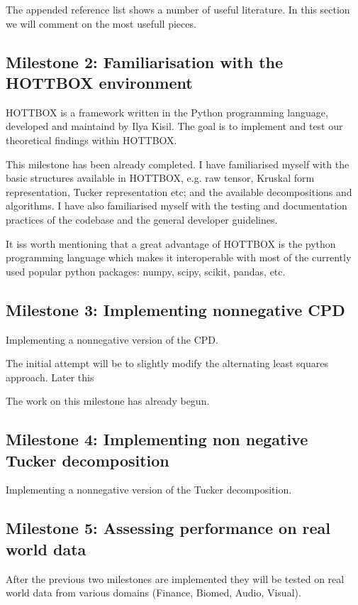 \documentclass{article}
\begin{document}
The appended reference list shows a number of useful literature. In this section we will comment on the most usefull pieces.

\subsection{Milestone 2: Familiarisation with the HOTTBOX environment}

HOTTBOX is a framework written in the Python programming language, developed and maintaind by Ilya Kisil. The goal is to implement and test our theoretical findings within HOTTBOX.

This milestone has been already completed. I have familiarised myself with the basic structures available in HOTTBOX, e.g. raw tensor, Kruskal form representation, Tucker representation etc; and the available decompositions and algorithms. I have also familiarised myself with the testing and documentation practices of the codebase and the general developer guidelines.

It iss worth mentioning that a great advantage of HOTTBOX is the python programming language which makes it interoperable with most of the currently used popular python packages: numpy, scipy, scikit, pandas, etc.


\subsection{Milestone 3: Implementing nonnegative CPD}
Implementing a nonnegative version of the CPD. 

The initial attempt will be to slightly modify the alternating least squares approach. Later this

The work on this milestone has already begun.

\subsection{Milestone 4: Implementing non negative Tucker decomposition}

Implementing a nonnegative version of the Tucker decomposition. 

\subsection{Milestone 5: Assessing performance on real world data}

After the previous two milestones are implemented they will be tested on real world data from various domains (Finance, Biomed, Audio, Visual). 
\end{document}
